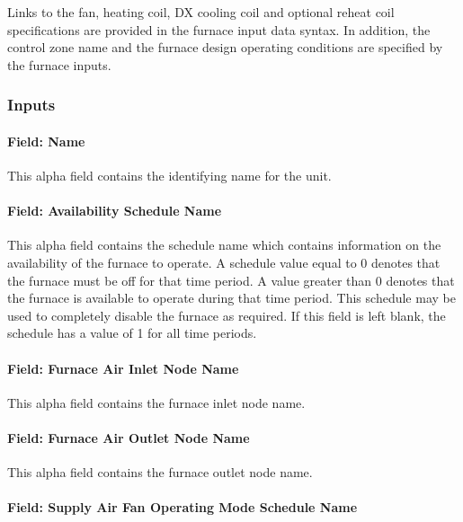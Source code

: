 Links to the fan, heating coil, DX cooling coil and optional reheat coil specifications are provided in the furnace input data syntax. In addition, the control zone name and the furnace design operating conditions are specified by the furnace inputs.

\subsubsection{Inputs}\label{inputs-2-043}

\paragraph{Field: Name}\label{field-name-2-040}

This alpha field contains the identifying name for the unit.

\paragraph{Field: Availability Schedule Name}\label{field-availability-schedule-name-1-012}

This alpha field contains the schedule name which contains information on the availability of the furnace to operate. A schedule value equal to 0 denotes that the furnace must be off for that time period. A value greater than 0 denotes that the furnace is available to operate during that time period. This schedule may be used to completely disable the furnace as required. If this field is left blank, the schedule has a value of 1 for all time periods.

\paragraph{Field: Furnace Air Inlet Node Name}\label{field-furnace-air-inlet-node-name}

This alpha field contains the furnace inlet node name.

\paragraph{Field: Furnace Air Outlet Node Name}\label{field-furnace-air-outlet-node-name}

This alpha field contains the furnace outlet node name.

\paragraph{Field: Supply Air Fan Operating Mode Schedule Name}\label{field-supply-air-fan-operating-mode-schedule-name}

